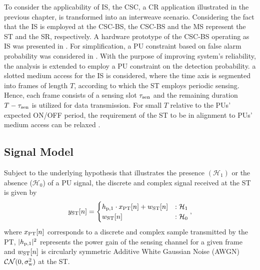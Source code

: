 To consider the applicability of IS, the CSC, a CR application illustrated in the previous chapter, is transformed into an interweave scenario. Considering the fact that the IS is employed at the CSC-BS, the CSC-BS and the MS represent the ST and the SR, respectively. A hardware prototype of the CSC-BS operating as IS was presented in \cite{Kaushik13}. For simplification, a PU constraint based on false alarm probability was considered in \cite{Kaushik13}. With the purpose of improving system's reliability, the analysis is extended to employ a PU constraint on the detection probability.  a slotted medium access for the IS is considered, where the time axis is segmented into frames of length $T$, according to which the ST employs periodic sensing. Hence, each frame consists of a sensing slot $\tau_{\text{sen}}$ and the remaining duration $T - \tau_{\text{sen}}$ is utilized for data transmission. For small $T$ relative to the PUs' expected ON/OFF period, the requirement of the ST to be in alignment to PUs' medium access can be relaxed \cite{Wang09, Tang11, Zhao12}.  
 
\subsection{Signal Model}
Subject to the underlying hypothesis that illustrates the presence $(\mathcal{H}_1)$ or the absence ($\mathcal{H}_0$) of a PU signal, the discrete and complex signal received at the ST is given by  
\begin{equation}
y_{\text{ST}}[n] = 
\begin{cases}
h_{\text{p,1}} \cdot x_{\text{PT}}[n] + w_{\text{ST}}[n] & : \mathcal{H}_1 \\
w_{\text{ST}}[n] & :\mathcal{H}_0
\end{cases},
\label{eq_IS:sys_mod_p1s}
\end{equation}
where $x_{\text{PT}}[n]$ corresponds to a discrete and complex sample transmitted by the PT, $|h_{\text{p,1}}|^2$ represents the power gain of the sensing channel for a given frame and $w_{\text{ST}}[n]$ is circularly symmetric Additive White Gaussian Noise (AWGN) $\mathcal{CN}(0, \sigma^2_{\text{w}})$ at the ST. 

